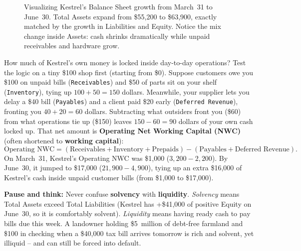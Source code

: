 \begin{figure}[htbp]
\caption{Visualizing Kestrel's Balance Sheet growth from March~31 to June~30. Total Assets expand from \$55,200 to \$63,900, exactly matched by the growth in Liabilities and Equity. Notice the mix change inside Assets: cash shrinks dramatically while unpaid receivables and hardware grow.}
\label{fig:ch02-balance-sheet-comparison}
\end{figure}
How much of Kestrel's own money is locked inside day-to-day operations? Test the logic on a tiny \$100 shop first (starting from \$0). Suppose customers owe you \$100 on unpaid bills (\texttt{Receivables}) and \$50 of parts sit on your shelf (\texttt{Inventory}), tying up $100 + 50 = 150$ dollars. Meanwhile, your supplier lets you delay a \$40 bill (\texttt{Payables}) and a client paid \$20 early (\texttt{Deferred Revenue}), fronting you $40 + 20 = 60$ dollars. Subtracting what outsiders front you (\$60) from what operations tie up (\$150) leaves $150 - 60 = 90$ dollars of your own cash locked up. That net amount is \textbf{Operating Net Working Capital (NWC)} (often shortened to \textbf{working capital}):
\begin{equation}
  \label{eq:operating-nwc}
  \text{Operating NWC} = (\text{Receivables} + \text{Inventory} + \text{Prepaids}) - (\text{Payables} + \text{Deferred Revenue}).
\end{equation}
On March~31, Kestrel's Operating NWC was \$1,000 ($3{,}200 - 2{,}200$). By June~30, it jumped to \$17,000 ($21{,}900 - 4{,}900$), tying up an extra \$16,000 of Kestrel's cash inside unpaid customer bills (from \$1,000 to \$17,000).

\begin{recoverybox}
\textbf{Pause and think:} Never confuse \textbf{solvency} with \textbf{liquidity}. \emph{Solvency} means Total Assets exceed Total Liabilities (Kestrel has +\$41,000 of positive Equity on June~30, so it is comfortably solvent). \emph{Liquidity} means having ready cash to pay bills due this week. A landowner holding \$5~million of debt-free farmland and \$100 in checking when a \$40,000 tax bill arrives tomorrow is rich and solvent, yet illiquid -- and can still be forced into default.
\end{recoverybox}

